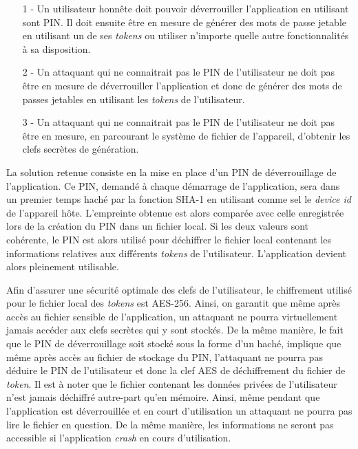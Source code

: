 \begin{itemize}
  \item[1 -] Un utilisateur honnête doit pouvoir déverrouiller l'application en utilisant 
  sont PIN. Il doit ensuite être en mesure de générer des mots de passe jetable en utilisant
  un de ses \emph{tokens} ou utiliser n'importe quelle autre fonctionnalités à sa
  disposition.
  \item[2 -] Un attaquant qui ne connaitrait pas le PIN de l'utilisateur ne doit pas être en
  mesure de déverrouiller l'application et donc de générer des mots de passes jetables en
  utilisant les \emph{tokens} de l'utilisateur.
  \item[3 -] Un attaquant qui ne connaitrait pas le PIN de l'utilisateur ne doit pas être en
  mesure, en parcourant le système de fichier de l'appareil, d'obtenir les clefs secrètes
  de génération.
\end{itemize}

La solution retenue consiste en la mise en place d'un PIN de déverrouillage de l'application.
Ce PIN, demandé à chaque démarrage de l'application, sera dans un premier temps haché par la
fonction SHA-1 en utilisant comme sel le \emph{device id} de l'appareil hôte. L'empreinte 
obtenue est alors comparée avec celle enregistrée lors de la création du PIN dans un fichier
local. Si les deux valeurs sont cohérente, le PIN est alors utilisé pour déchiffrer le
fichier local contenant les informations relatives aux différents \emph{tokens} de
l'utilisateur. L'application devient alors pleinement utilisable.

Afin d'assurer une sécurité optimale des clefs de l'utilisateur, le chiffrement utilisé pour
le fichier local des \emph{tokens} est AES-256. Ainsi, on garantit que même après accès au
fichier sensible de l'application, un attaquant ne pourra virtuellement jamais accéder aux
clefs secrètes qui y sont stockés. De la même manière, le fait que le PIN de déverrouillage
soit stocké sous la forme d'un haché, implique que même après accès au fichier de stockage du
PIN, l'attaquant ne pourra pas déduire le PIN de l'utilisateur et donc la clef AES de
déchiffrement du fichier de \emph{token}. Il est à noter que le fichier contenant les données
privées de l'utilisateur n'est jamais déchiffré autre-part qu'en mémoire. Ainsi, même pendant
que l'application est déverrouillée et en court d'utilisation un attaquant ne pourra pas lire
le fichier en question. De la même manière, les informations ne seront pas accessible si 
l'application \emph{crash} en cours d'utilisation.




